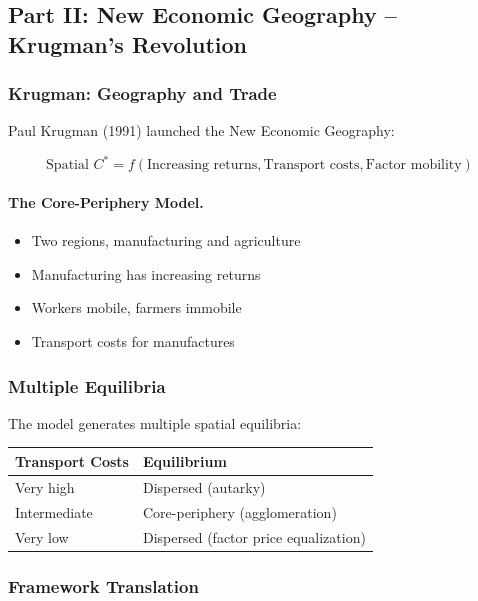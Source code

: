 \subsection{Part II: New Economic Geography – Krugman's Revolution}

\subsubsection{Krugman: Geography and Trade}

Paul Krugman (1991) launched the New Economic Geography:

\begin{equation}
\boxed{
\text{Spatial } C^* = f(\text{Increasing returns}, \text{Transport costs}, \text{Factor mobility})
}
\label{eq:neg}
\end{equation}

\paragraph{The Core-Periphery Model.}
\begin{itemize}
    \item Two regions, manufacturing and agriculture
    \item Manufacturing has increasing returns
    \item Workers mobile, farmers immobile
    \item Transport costs for manufactures
\end{itemize}

\subsubsection{Multiple Equilibria}

The model generates multiple spatial equilibria:

\begin{center}
\renewcommand{\arraystretch}{1.3}
\begin{tabular}{|l|l|}
\hline
\textbf{Transport Costs} & \textbf{Equilibrium} \\
\hline
Very high & Dispersed (autarky) \\
Intermediate & Core-periphery (agglomeration) \\
Very low & Dispersed (factor price equalization) \\
\hline
\end{tabular}
\end{center}

\subsubsection{Framework Translation}

